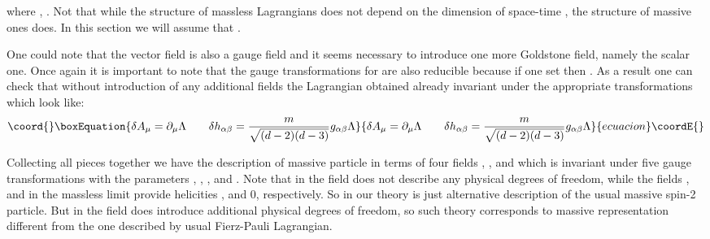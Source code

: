 \documentclass[a4paper,12pt]{article}
\begin{document}
where \coordHE{}, \coordHE{}.
Not that while the structure of massless Lagrangians does not depend on
the dimension of space-time \coordHE{}, the structure of massive ones does. In
this section we will assume that \coordHE{}.

One could note that the vector field \coordHE{} is also a gauge field and it
seems necessary to introduce one more Goldstone field, namely the scalar
one. Once again it is important to note that the gauge transformations for
\coordHE{} are also reducible because if one set \coordHE{} then \coordHE{}. As a result
one can check that without introduction of any additional fields the
Lagrangian obtained already invariant under the appropriate
transformations which look like:
\begin{equation}\coord{}\boxEquation{
\delta A_\mu = \partial_\mu \Lambda \qquad \delta h_{\alpha\beta} =
\frac{m}{\sqrt{(d-2)(d-3)}} g_{\alpha\beta} \Lambda
}{
\delta A_\mu = \partial_\mu \Lambda \qquad \delta h_{\alpha\beta} =
\frac{m}{\sqrt{(d-2)(d-3)}} g_{\alpha\beta} \Lambda
}{ecuacion}\coordE{}\end{equation}

Collecting all pieces together we have the description of massive particle
in terms of four fields \myHighlight{$\Phi_{\mu\nu,\alpha}$}\coordHE{}, \coordHE{},
\coordHE{} and \coordHE{} which is invariant under five gauge
transformations with the parameters \coordHE{}, \coordHE{},
\coordHE{}, \coordHE{} and \myHighlight{$\Lambda$}\coordHE{}. Note that in \coordHE{} the field
\myHighlight{$\Phi_{\mu\nu,\alpha}$}\coordHE{} does not describe any physical degrees of freedom,
while the fields \coordHE{}, \coordHE{} and \coordHE{} in the
massless limit provide helicities \coordHE{}, \coordHE{} and 0, respectively.
So in \coordHE{} our theory is just alternative description
of the usual massive spin-2 particle. But in \coordHE{} the field
\myHighlight{$\Phi_{\mu\nu,\alpha}$}\coordHE{} does introduce additional physical degrees of
freedom, so such theory corresponds to massive representation different
from the one described by usual Fierz-Pauli Lagrangian.
\end{document}
